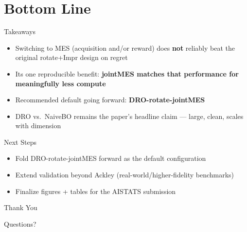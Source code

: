 \documentclass{beamer}
\begin{document}
\section{Bottom Line}

\begin{frame}{Takeaways}
    \begin{itemize}
        \item Switching to MES (acquisition and/or reward) does \textbf{not} reliably beat the original rotate+Impr design on regret
        \item Its one reproducible benefit: \textbf{jointMES matches that performance for meaningfully less compute}
        \item Recommended default going forward: \textbf{DRO-rotate-jointMES}
        \item DRO vs.\ NaiveBO remains the paper's headline claim --- large, clean, scales with dimension
    \end{itemize}
\end{frame}

\begin{frame}{Next Steps}
    \begin{itemize}
        \item Fold DRO-rotate-jointMES forward as the default configuration
        \item Extend validation beyond Ackley (real-world/higher-fidelity benchmarks)
        \item Finalize figures + tables for the AISTATS submission
    \end{itemize}
\end{frame}

\begin{frame}
    \begin{center}
        {\Huge\calligra Thank You}
        \vspace{1cm}

        {\large Questions?}
    \end{center}
\end{frame}
\end{document}
